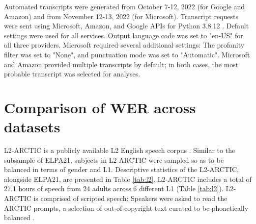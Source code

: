 \documentclass [PhD] {uclathes}
\begin{document}
Automated transcripts were generated from October 7-12, 2022 (for Google and Amazon) and from November 12-13, 2022 (for Microsoft). Transcript requests were sent using Microsoft, Amazon, and Google APIs for Python 3.8.12 \cite{python2022}. Default settings were used for all services. Output language code was set to "en-US" for all three providers. Microsoft required several additional settings: The profanity filter was set to "None", and punctuation mode was set to "Automatic". Microsoft and Amazon provided multiple transcripts by default; in both cases, the most probable transcript was selected for analyses. 

\section{Comparison of WER across datasets}
\label{sec:appendix_l2}

L2-ARCTIC is a publicly available L2 English speech corpus \cite{zhao2018l2}. Similar to the subsample of ELPA21, subjects in L2-ARCTIC were sampled so as to be balanced in terms of gender and L1. Descriptive statistics of the L2-ARCTIC, alongside ELPA21, are presented in Table \ref{tab:l2}. L2-ARCTIC includes a total of 27.1 hours of speech from 24 adults across 6 different L1 (Table \ref{tab:l2}). L2-ARCTIC is comprised of scripted speech: Speakers were asked to read the ARCTIC prompts, a selection of out-of-copyright text curated to be phonetically balanced \cite{kominek2003}. 
\end{document}
